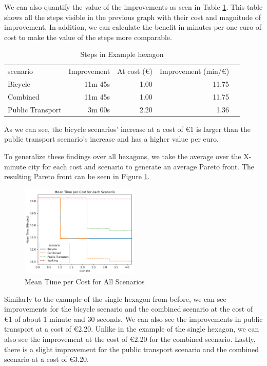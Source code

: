 We can also quantify the value of the improvements as seen in Table \ref{tab:differences_in_example_hexagon}.
This table shows all the steps visible in the previous graph with their cost and magnitude of improvement.
In addition, we can calculate the benefit in minutes per one euro of cost to make the value of the steps more comparable.
\begin{table}
  \caption{Steps in Example hexagon}
  \label{tab:differences_in_example_hexagon}
  \begin{center}
    \begin{tabular}{lrrrl}
     scenario & Improvement & At cost (\euro) & Improvement (min/\euro) \\
     Bicycle & 11m 45s & 1.00 & 11.75 \\
     Combined & 11m 45s & 1.00 & 11.75 \\
     Public Transport & 3m 00s & 2.20 & 1.36 \\
    \end{tabular}
  \end{center}
\end{table}
As we can see, the bicycle scenarios' increase at a cost of \euro{1} is larger than the public transport scenario's increase and has a higher value per euro.

To generalize these findings over all hexagons, we take the average over the X-minute city for each cost and scenario to generate an average Pareto front.
The resulting Pareto front can be seen in Figure \ref{fig:mean_time_per_cost}.
\begin{figure}
  \begin{center}
     \includegraphics[width=0.5\textwidth]{Figures/results/metric_cost/mean_time_per_cost}
  \end{center}
  \caption{Mean Time per Cost for All Scenarios}
  \label{fig:mean_time_per_cost}
\end{figure}
Similarly to the example of the single hexagon from before, we can see improvements for the bicycle scenario and the combined scenario at the cost of \euro{1} of about 1 minute and 30 seconds.
We can also see the improvements in public transport at a cost of \euro{2.20}.
Unlike in the example of the single hexagon, we can also see the improvement at the cost of \euro{2.20} for the combined scenario.
Lastly, there is a slight improvement for the public transport scenario and the combined scenario at a cost of \euro{3.20}.

